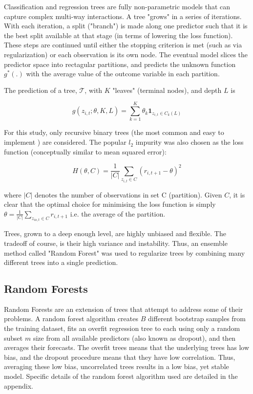 \documentclass[man, a4paper, biblatex]{article}
\begin{document}
Classification and regression trees are fully non-parametric models that can capture complex multi-way interactions. A tree "grows" in a series of iterations. With each iteration, a split ("branch") is made along one predictor such that it is the best split available at that stage (in terms of lowering the loss function). These steps are continued until either the stopping criterion is met (such as via regularization) or each observation is its own node. The eventual model slices the predictor space into rectagular partitions, and predicts the unknown function $g^*(.)$ with the average value of the outcome variable in each partition.

The prediction of a tree, $\mathcal{T}$, with \(K\) "leaves" (terminal nodes), and depth $L$ is

\begin{equation}
	g(z_{i,t};\theta,K,L) = \sum_{k=1}^{K}\theta_k\textbf{1}_{z_{i,t}\in C_k(L)}
\end{equation}

For this study, only recursive binary trees (the most common and easy to implement ) are considered. The popular $l_2$ impurity was also chosen as the loss function (conceptually similar to mean squared error):

\begin{equation}
	H(\theta, C) = \frac{1}{|C|} \sum_{z_{i,t} \in C} (r_{i,t+1} - \theta)^2
\end{equation}

where $|C|$ denotes the number of observations in set C (partition). Given $C$, it is clear that the optimal choice for minimising the loss function is simply $\theta = \frac{1}{|C|} \sum_{z_{io,t}\in C}^{ }r_{i,t+1}$ i.e. the average of the partition.

Trees, grown to a deep enough level, are highly unbiased and flexible. The tradeoff of course, is their high variance and instability. Thus, an ensemble method called "Random Forest" was used to regularize trees by combining many different trees into a single prediction.

\subsection{Random Forests}
Random Forests are an extension of trees that attempt to address some of their problems. A random forest algorithm creates $B$ different bootstrap samples from the training dataset, fits an overfit regression tree to each using only a random subset $m$ size from all available predictors (also known as dropout), and then averages their forecasts. The overfit trees means that the underlying trees has low bias, and the dropout procedure means that they have low correlation. Thus, averaging these low bias, uncorrelated trees results in a low bias, yet stable model. Specific details of the random forest algorithm used are detailed in the appendix.
\end{document}
